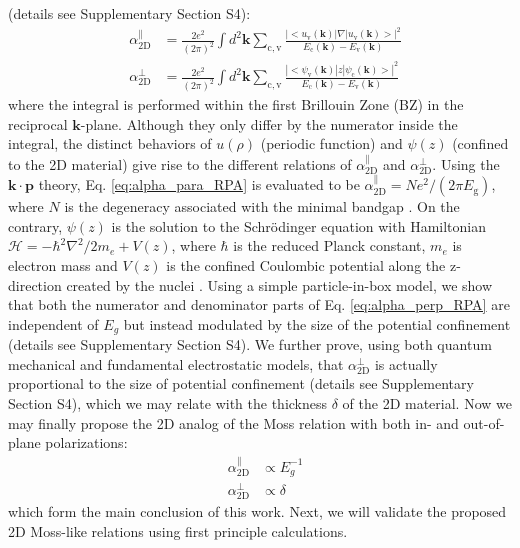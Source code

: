 \documentclass[journal=ancac3,manuscript=article,email=true,hyperref=true,keywords=false]{achemso}
\begin{document}
(details see Supplementary Section S4):
\begin{subequations}
  \begin{eqnarray}
  \label{eq:alpha_para_RPA}
  & \alpha_{\mathrm{2D}}^{\parallel} &= \frac{2e^{2}}
  {(2 \pi)^{2}} \int d^{2}\mathbf{k} \sum_{\mathrm{c, v}}
  \frac{|<u_{\mathrm{v}}(\mathbf{k})|\nabla|u_{\mathrm{v}}(\mathbf{k})>|^{2}}
                         {E_{\mathrm{c}}(\mathbf{k}) - E_{\mathrm{v}}(\mathbf{k})} \\
  \label{eq:alpha_perp_RPA}
  & \alpha_{\mathrm{2D}}^{\perp} &= \frac{2e^{2}}{(2 \pi) ^{2}} \int d^{2}\mathbf{k}
  \sum_{\mathrm{c, v}}
  \frac{|<\psi_{\mathrm{v}}(\mathbf{k})|z|\psi_{\mathrm{c}}(\mathbf{k})>|^{2}}
  {E_{\mathrm{c}}(\mathbf{k}) - E_{\mathrm{v}}(\mathbf{k})}
  \end{eqnarray}
\end{subequations}
where the integral is performed within the first Brillouin Zone (BZ)
in the reciprocal $\mathbf{k}$-plane. Although they only differ by the
numerator inside the integral, the distinct behaviors of $u(\rho)$
(periodic function) and $\psi(z)$ (confined to the 2D material) give
rise to the different relations of $\alpha_{\mathrm{2D}}^{\parallel}$ and
$\alpha_{\mathrm{2D}}^{\perp}$. Using the $\mathbf{k} \cdot \mathbf{p}$ theory,
Eq. \ref{eq:alpha_para_RPA} is evaluated to be
$\alpha_{\mathrm{2D}}^{\parallel} = N e^{2}/(2\pi E_{\mathrm{g}})$, where $N$ is the
degeneracy associated with the minimal bandgap
\cite{Jiang_2017_Eg_Eb}. On the contrary, $\psi(z)$ is the solution to
the Schr\"{o}dinger equation with Hamiltonian
$\mathcal{H} = -\hbar^{2} \nabla^{2}/2m_{e} + V(z)$, where $\hbar$ is
the reduced Planck constant, $m_{e}$ is electron mass and $V(z)$ is
the confined Coulombic potential along the z-direction created by the
nuclei \cite{davies_physics_1997,ihn_semiconductor_2009}. Using a
simple particle-in-box model, we show that both the numerator and
denominator parts of Eq. \ref{eq:alpha_perp_RPA} are independent of
$E_{g}$ but instead modulated by the size of the potential confinement
(details see Supplementary Section S4). We further prove, using both
quantum mechanical and fundamental electrostatic models, that
$\alpha_{\mathrm{2D}}^{\perp}$ is actually proportional to the size of potential
confinement (details see Supplementary Section S4), which we may
relate with the thickness $\delta$ of the 2D material. Now we may
finally propose the 2D analog of the Moss relation with both in- and
out-of-plane polarizations:
\begin{subequations}
\begin{eqnarray}
\label{eq:2D-Moss-para}
  &\alpha_{\mathrm{2D}}^{\parallel} &\propto E_{g}^{-1} \\
  \label{eq:2D-Moss-perp}
  &\alpha_{\mathrm{2D}}^{\perp} & \propto \delta
\end{eqnarray}
\end{subequations}
which form the main conclusion of this work. Next, we will validate
the proposed 2D Moss-like relations using first principle
calculations.
\fi
\end{document}
